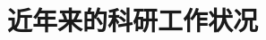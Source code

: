 
\title{近年来的科研工作状况}
\author[ ]{}   %
\renewcommand*{\Authfont}{\small\rm} %
\renewcommand*{\Affilfont}{\small\it} %
\renewcommand\Authands{ and } %
\renewcommand\Authands{ , } %
\date{} %


